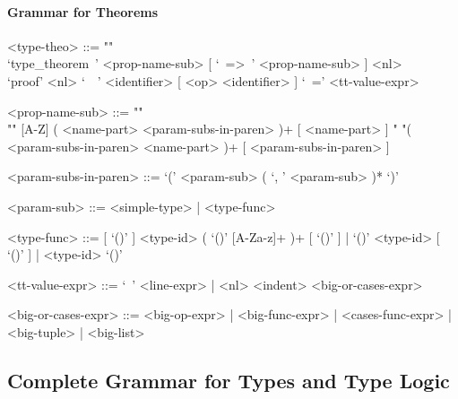 \documentclass{article}
\begin{document}
\paragraph{Grammar for Theorems}

\begin{grammar}
<type-theo> ::= ""\\
`type_theorem\ ' <prop-name-sub> [ `\ =>\ ' <prop-name-sub> ] <nl> \\
`proof' <nl> `\ \ ' <identifier> [ <op> <identifier> ] `\ =' <tt-value-expr>

<prop-name-sub> ::=  ""\\""
[A-Z] ( <name-part> <param-subs-in-paren> )+ [ <name-part> ]
\alt " "( <param-subs-in-paren> <name-part> )+ [ <param-subs-in-paren> ]

<param-subs-in-paren> ::= `(' <param-sub> ( `, ' <param-sub> )* `)'

<param-sub> ::= <simple-type> | <type-func>

<type-func> ::=
[ `()' ] <type-id> ( `()' [A-Za-z]+ )+ [ `()' ] | `()' <type-id> [ `()' ] |
<type-id> `()'

<tt-value-expr> ::= `\ ' <line-expr> | <nl> <indent> <big-or-cases-expr>

<big-or-cases-expr> ::=
<big-op-expr> | <big-func-expr> | <cases-func-expr> | <big-tuple> | <big-list>
\end{grammar} 

\subsection{Complete Grammar for Types and Type Logic}
\end{document}
